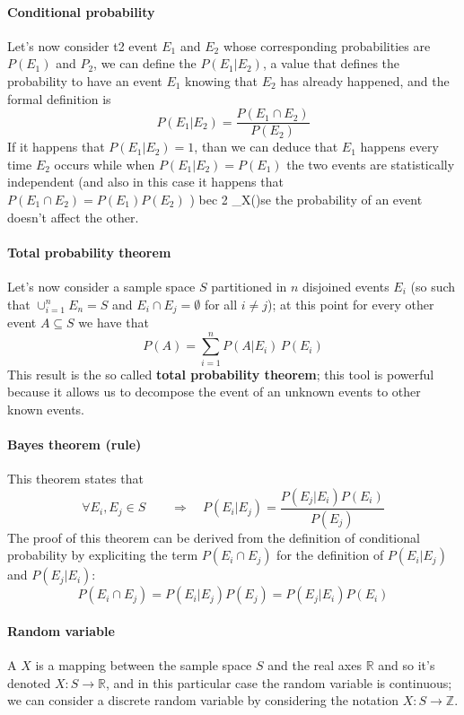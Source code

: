 	\paragraph{Conditional probability} Let's now consider t2 event $E_1$ and $E_2$ whose corresponding probabilities are $P(E_1)$ and $P_2$, we can define the  $P(E_1|E_2)$, a value that defines the probability to have an event $E_1$ knowing that $E_2$ has already happened, and the formal definition is
	\begin{equation}
		P(E_1|E_2) = \frac{P(E_1\cap E_2)}{P(E_2)}
	\end{equation}
	If it happens that $P(E_1|E_2) = 1$, than we can deduce that $E_1$ happens every time $E_2$ occurs while when $P(E_1|E_2) = P(E_1)$ the two events are statistically independent (and also in this case it happens that $P(E_1\cap E_2) = P(E_1)P(E_2)$ ) bec {2\pi} \intinf \Phi_X(\Omega)se the probability of an event doesn't affect the other.
	
	\paragraph{Total probability theorem} Let's now consider a sample space $S$ partitioned in $n$ disjoined events $E_i$ (so such that $\cup_{i=1}^n E_n = S$ and $E_i \cap E_j = \emptyset$ for all $i\neq j$); at this point for every other event $A\subseteq S$ we have that
	\[ P(A) = \sum_{i=1}^n P(A|E_i)\, P(E_i) \]
	This result is the so called \textbf{total probability theorem}; this tool is powerful because it allows us to decompose the event of an unknown events to other known events.
	
	\paragraph{Bayes theorem (rule)} This theorem states that
	\[\forall E_i,E_j \in S \qquad \Rightarrow \quad P(E_i | E_j) = \frac{P(E_j|E_i) P(E_i)}{P(E_j)}\]
	The proof of this theorem can be derived from the definition of conditional probability by expliciting the term $P(E_i\cap E_j)$ for the definition of $P(E_i|E_j)$ and $P(E_j|E_i)$:
	\[ P(E_i\cap E_j) = P(E_i|E_j) P(E_j) = P(E_j|E_i) P(E_i) \]
	
	
	\paragraph{Random variable} A  $X$ is a mapping between the sample space $S$ and the real axes $\mathds R$ and so it's denoted $X:S \rightarrow \mathds R$, and in this particular case the random variable is continuous; we can consider a discrete random variable by considering the notation $X: S \rightarrow \mathds Z$.
	
